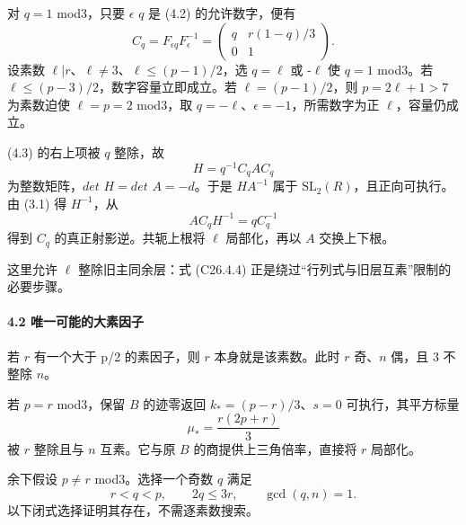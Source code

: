 \documentclass[11pt,a4paper]{article}
\theoremstyle{definition}
\numberwithin{equation}{section}
\begin{document}
{对} {\ensuremath{q=1}} {mod3，只要} {\ensuremath{\epsilon }} {\ensuremath{q}} {是} {(4.2)} {的允许数字，便有} \[
C_q=F_{\epsilon q}F_\epsilon^{-1}
=\begin{pmatrix}q&r(1-q)/3\\0&1\end{pmatrix}.
\tag{C26.4.3}
\] {设素数} {\ensuremath{\ell |r}、\ensuremath{\ell \ne 3}、\ensuremath{\ell \le (p-1)/2}，选} {\ensuremath{q=\ell }} {或} {-\ensuremath{\ell }} {使} {\ensuremath{q=1}} {mod3。若} {\ensuremath{\ell \le (p-3)/2}，数字容量立即成立。若} {\ensuremath{\ell =(p-1)/2}，则} {\ensuremath{p=2\ell +1>7}} {为素数迫使} {\ensuremath{\ell =p=2}} {mod3，取} {\ensuremath{q=-\ell }、\ensuremath{\epsilon =-1}，所需数字为正} {\ensuremath{\ell }，容量仍成立。}

{(4.3)} {的右上项被} {\ensuremath{q}} {整除，故} \[
H=q^{-1}C_qAC_q
\] {为整数矩阵，\ensuremath{det}} {\ensuremath{H=det}} {\ensuremath{A=-d}。于是} {\ensuremath{HA^{-1}}} {属于} {\ensuremath{\mathrm{SL}_{2}(R)}，且正向可执行。由} {(3.1)} {得} {\ensuremath{H^{-1}}，从} \[
AC_qH^{-1}=qC_q^{-1}
\tag{C26.4.4}
\] {得到} {\ensuremath{C_{q}}} {的真正射影逆。共轭上根将} {\ensuremath{\ell }} {局部化，再以} {\ensuremath{A}} {交换上下根。}

{这里允许} {\ensuremath{\ell }} {整除旧主同余层：式} {(C26.4.4)} {正是绕过``行列式与旧层互素''限制的必要步骤。}

\paragraph*{\texorpdfstring{{4.2} {唯一可能的大素因子}}{4.2 唯一可能的大素因子}}\label{C26-h162}

{若} {\ensuremath{r}} {有一个大于} {p/2} {的素因子，则} {\ensuremath{r}} {本身就是该素数。此时} {\ensuremath{r}} {奇、\ensuremath{n}} {偶，且} {3} {不整除} {\ensuremath{n}。}

{若} {\ensuremath{p=r}} {mod3，保留} {\ensuremath{B}} {的迹零返回} {\ensuremath{k_*=(p-r)/3}、\ensuremath{s=0}} {可执行，其平方标量} \[
\mu_*=\frac{r(2p+r)}3
\] {被} {\ensuremath{r}} {整除且与} {\ensuremath{n}} {互素。它与原} {\ensuremath{B}} {的商提供上三角倍率，直接将} {\ensuremath{r}} {局部化。}

{余下假设} {\ensuremath{p\ne r}} {mod3。选择一个奇数} {\ensuremath{q}} {满足} \[
r<q<p,\qquad2q\le3r,\qquad\gcd(q,n)=1.
\tag{C26.4.5}
\] {以下闭式选择证明其存在，不需逐素数搜索。}
\end{document}
